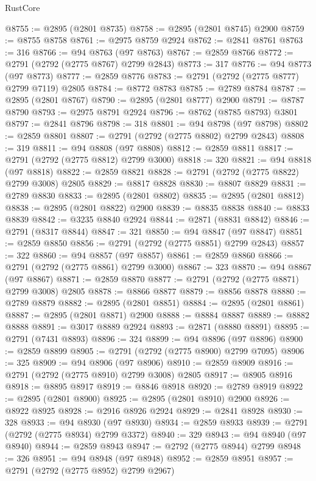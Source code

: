 \begin{lexlean}{RustCore}
\begin{coremodule}
@8755 := @2895 (@2801 @8735)
@8758 := @2895 (@2801 @8745) @2900
@8759 := @8755 @8758
@8761 := @2975 @8759 @2924
@8762 := @2841 @8761
@8763 := 316
@8766 := @94 @8763 (@97 @8763)
@8767 := @2859 @8766
@8772 := @2791 (@2792 (@2775 @8767) @2799 @2843)
@8773 := 317
@8776 := @94 @8773 (@97 @8773)
@8777 := @2859 @8776
@8783 := @2791 (@2792 (@2775 @8777) @2799 @7119) @2805
@8784 := @8772 @8783
@8785 := @2789 @8784
@8787 := @2895 (@2801 @8767)
@8790 := @2895 (@2801 @8777) @2900
@8791 := @8787 @8790
@8793 := @2975 @8791 @2924
@8796 := @8762 (@8785 @8793) @3801
@8797 := @2841 @8796
@8798 := 318
@8801 := @94 @8798 (@97 @8798)
@8802 := @2859 @8801
@8807 := @2791 (@2792 (@2775 @8802) @2799 @2843)
@8808 := 319
@8811 := @94 @8808 (@97 @8808)
@8812 := @2859 @8811
@8817 := @2791 (@2792 (@2775 @8812) @2799 @3000)
@8818 := 320
@8821 := @94 @8818 (@97 @8818)
@8822 := @2859 @8821
@8828 := @2791 (@2792 (@2775 @8822) @2799 @3008) @2805
@8829 := @8817 @8828
@8830 := @8807 @8829
@8831 := @2789 @8830
@8833 := @2895 (@2801 @8802)
@8835 := @2895 (@2801 @8812)
@8838 := @2895 (@2801 @8822) @2900
@8839 := @8835 @8838
@8840 := @8833 @8839
@8842 := @3235 @8840 @2924
@8844 := @2871 (@8831 @8842)
@8846 := @2791 (@8317 @8844)
@8847 := 321
@8850 := @94 @8847 (@97 @8847)
@8851 := @2859 @8850
@8856 := @2791 (@2792 (@2775 @8851) @2799 @2843)
@8857 := 322
@8860 := @94 @8857 (@97 @8857)
@8861 := @2859 @8860
@8866 := @2791 (@2792 (@2775 @8861) @2799 @3000)
@8867 := 323
@8870 := @94 @8867 (@97 @8867)
@8871 := @2859 @8870
@8877 := @2791 (@2792 (@2775 @8871) @2799 @3008) @2805
@8878 := @8866 @8877
@8879 := @8856 @8878
@8880 := @2789 @8879
@8882 := @2895 (@2801 @8851)
@8884 := @2895 (@2801 @8861)
@8887 := @2895 (@2801 @8871) @2900
@8888 := @8884 @8887
@8889 := @8882 @8888
@8891 := @3017 @8889 @2924
@8893 := @2871 (@8880 @8891)
@8895 := @2791 (@7431 @8893)
@8896 := 324
@8899 := @94 @8896 (@97 @8896)
@8900 := @2859 @8899
@8905 := @2791 (@2792 (@2775 @8900) @2799 @7095)
@8906 := 325
@8909 := @94 @8906 (@97 @8906)
@8910 := @2859 @8909
@8916 := @2791 (@2792 (@2775 @8910) @2799 @3008) @2805
@8917 := @8905 @8916
@8918 := @8895 @8917
@8919 := @8846 @8918
@8920 := @2789 @8919
@8922 := @2895 (@2801 @8900)
@8925 := @2895 (@2801 @8910) @2900
@8926 := @8922 @8925
@8928 := @2916 @8926 @2924
@8929 := @2841 @8928
@8930 := 328
@8933 := @94 @8930 (@97 @8930)
@8934 := @2859 @8933
@8939 := @2791 (@2792 (@2775 @8934) @2799 @3372)
@8940 := 329
@8943 := @94 @8940 (@97 @8940)
@8944 := @2859 @8943
@8947 := @2792 (@2775 @8944) @2799
@8948 := 326
@8951 := @94 @8948 (@97 @8948)
@8952 := @2859 @8951
@8957 := @2791 (@2792 (@2775 @8952) @2799 @2967)

\end{coremodule}
\end{lexlean}
